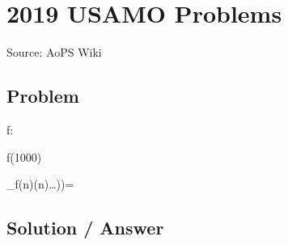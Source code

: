 \documentclass[12pt]{article}
\begin{document}
\section*{2019 USAMO Problems}
Source: AoPS Wiki

\subsection*{Problem}

f:\to{}

f(1000)

_{f(n)}(n)\ldots))=

\subsection*{Solution / Answer}
\end{document}
